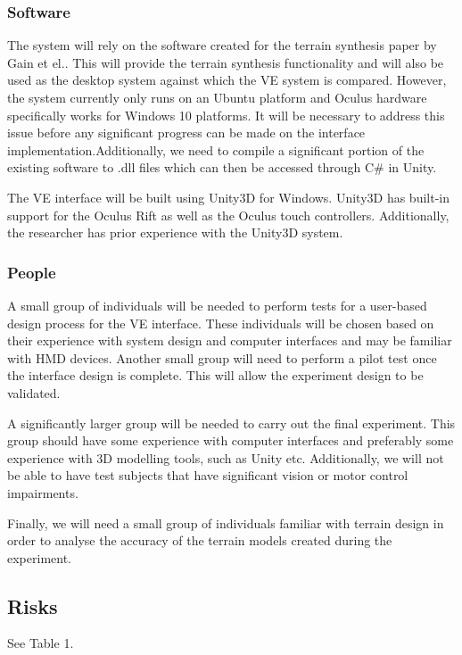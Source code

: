 \documentclass{sig-alternate-05-2015}
\begin{document}
\subsubsection{Software}
The system will rely on the software created for the terrain synthesis paper by Gain et el.\cite{Gain2015}. This will provide the terrain synthesis functionality and will also be used as the desktop system against which the VE system is compared. However, the system currently only runs on an Ubuntu platform and Oculus hardware specifically works for Windows 10 platforms. It will be necessary to address this issue before any significant progress can be made on the interface implementation.Additionally, we need to compile a significant portion of the existing software to .dll files which can then be accessed through C\# in Unity. 

The VE interface will be built using Unity3D for Windows. Unity3D has built-in support for the Oculus Rift as well as the Oculus touch controllers. Additionally, the researcher has prior experience with the Unity3D system.

\subsubsection{People}
A small group of individuals will be needed to perform tests for a user-based design process for the VE interface. These individuals will be chosen based on their experience with system design and computer interfaces and may be familiar with HMD devices. Another small group will need to perform a pilot test once the interface design is complete. This will allow the experiment design to be validated.

A significantly larger group will be needed to carry out the final experiment. This group should have some experience with computer interfaces and preferably some experience with 3D modelling tools, such as Unity etc. Additionally, we will not be able to have test subjects that have significant vision or motor control impairments.

Finally, we will need a small group of individuals familiar with terrain design in order to analyse the accuracy of the terrain models created during the experiment. 
\subsection{Risks}
See Table 1.
\end{document}
